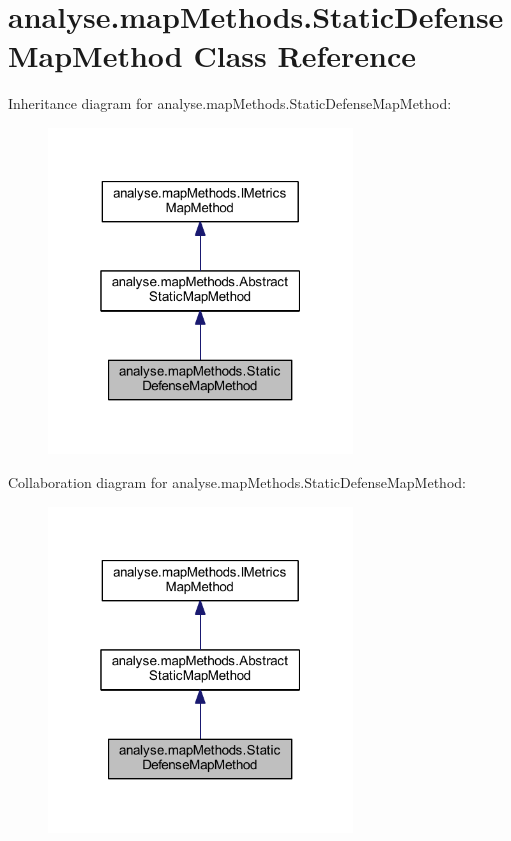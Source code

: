 \hypertarget{classanalyse_1_1map_methods_1_1_static_defense_map_method}{}\section{analyse.\+map\+Methods.\+Static\+Defense\+Map\+Method Class Reference}
\label{classanalyse_1_1map_methods_1_1_static_defense_map_method}


Inheritance diagram for analyse.\+map\+Methods.\+Static\+Defense\+Map\+Method\+:
\nopagebreak
\begin{figure}[H]
\begin{center}
\leavevmode
\includegraphics[width=229pt]{classanalyse_1_1map_methods_1_1_static_defense_map_method__inherit__graph}
\end{center}
\end{figure}


Collaboration diagram for analyse.\+map\+Methods.\+Static\+Defense\+Map\+Method\+:
\nopagebreak
\begin{figure}[H]
\begin{center}
\leavevmode
\includegraphics[width=229pt]{classanalyse_1_1map_methods_1_1_static_defense_map_method__coll__graph}
\end{center}
\end{figure}
